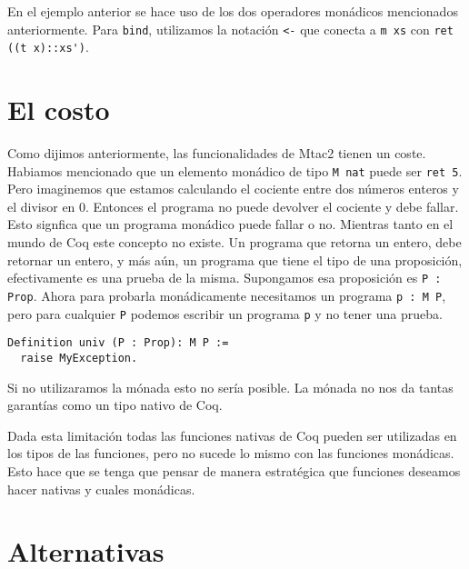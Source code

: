 En el ejemplo anterior se hace uso de los dos operadores monádicos mencionados anteriormente. Para \lstinline{bind}, utilizamos la notación \lstinline{<-} que conecta a \lstinline{m xs} con \lstinline{ret ((t x)::xs')}.

\section{El costo}

Como dijimos anteriormente, las funcionalidades de Mtac2 tienen un coste. Habiamos mencionado que un elemento monádico de tipo \lstinline{M nat} puede ser \lstinline{ret 5}. Pero imaginemos que estamos calculando el cociente entre dos números enteros y el divisor en 0. Entonces el programa no puede devolver el cociente y debe fallar. Esto signfica que un programa monádico puede fallar o no. Mientras tanto en el mundo de Coq este concepto no existe. Un programa que retorna un entero, debe retornar un entero, y más aún, un programa que tiene el tipo de una proposición, efectivamente es una prueba de la misma. Supongamos esa proposición es \lstinline{P : Prop}. Ahora para probarla monádicamente necesitamos un programa \lstinline{p : M P}, pero para cualquier \lstinline{P} podemos escribir un programa \lstinline{p} y no tener una prueba.
\begin{lstlisting}
Definition univ (P : Prop): M P :=
  raise MyException.
\end{lstlisting}

Si no utilizaramos la mónada esto no sería posible. La mónada no nos da tantas garantías como un tipo nativo de Coq.

Dada esta limitación todas las funciones nativas de Coq pueden ser utilizadas en los tipos de las funciones, pero no sucede lo mismo con las funciones monádicas. Esto hace que se tenga que pensar de manera estratégica que funciones deseamos hacer nativas y cuales monádicas.

\section{Alternativas}
